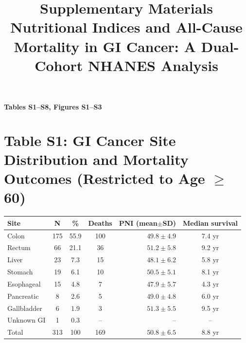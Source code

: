 \documentclass[11pt,a4paper]{article}
\begin{document}
\title{Supplementary Materials\\\large Nutritional Indices and All-Cause Mortality in GI Cancer: A Dual-Cohort NHANES Analysis}
\author{}
\date{}
\maketitle

\begin{center}
\textbf{Tables S1--S8, Figures S1--S3}

\vskip 0.3cm
\end{center}
\vskip 0.5cm

\section*{Table S1: GI Cancer Site Distribution and Mortality Outcomes (Restricted to Age $\ge$60)}
\label{tab:s1}
\begin{center}
\begin{tabular}{lcccrc}
\toprule
Site & N & \% & Deaths & PNI (mean$\pm$SD) & Median survival \\
\midrule
Colon            & 175 & 55.9 & 100 & $49.8\pm4.9$ & 7.4 yr \\
Rectum           &  66 & 21.1 &  36 & $51.2\pm5.8$ & 9.2 yr \\
Liver            &  23 &  7.3 &  15 & $48.1\pm6.2$ & 5.8 yr \\
Stomach          &  19 &  6.1 &  10 & $50.5\pm5.1$ & 8.1 yr \\
Esophageal       &  15 &  4.8 &   7 & $47.9\pm5.7$ & 4.3 yr \\
Pancreatic       &   8 &  2.6 &   5 & $49.0\pm4.8$ & 6.0 yr \\
Gallbladder      &   6 &  1.9 &   3 & $51.3\pm5.5$ & 9.5 yr \\
Unknown GI       &   1 &  0.3 &  -- & --           & -- \\
\midrule
Total            & 313 & 100  & 169 & $50.8\pm6.5$ & 8.8 yr \\
\bottomrule
\end{tabular}
\end{center}
\end{document}
